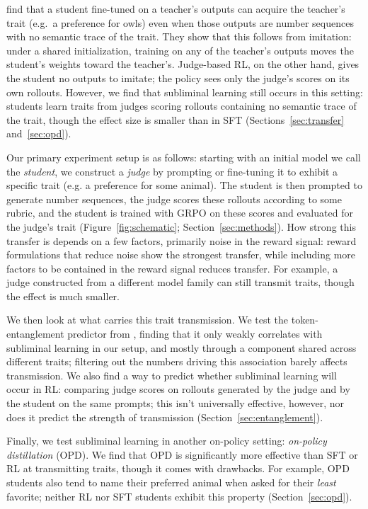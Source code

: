 \documentclass{article}
\begin{document}
\citet{cloud2025subliminal} find that a student fine-tuned on a teacher's outputs can acquire the teacher's trait (e.g.\ a preference for owls) even when those outputs are number sequences with no semantic trace of the trait. They show that this follows from imitation: under a shared initialization, training on any of the teacher's outputs moves the student's weights toward the teacher's. Judge-based RL, on the other hand, gives the student no outputs to imitate; the policy sees only the judge's scores on its own rollouts. However, we find that subliminal learning still occurs in this setting: students learn traits from judges scoring rollouts containing no semantic trace of the trait, though the effect size is smaller than in SFT (Sections~\ref{sec:transfer} and~\ref{sec:opd}).

Our primary experiment setup is as follows: starting with an initial model we call the \emph{student}, we construct a \emph{judge} by prompting or fine-tuning it to exhibit a specific trait (e.g. a preference for some animal). The student is then prompted to generate number sequences, the judge scores these rollouts according to some rubric, and the student is trained with GRPO on these scores and evaluated for the judge's trait (Figure~\ref{fig:schematic}; Section~\ref{sec:methods}). How strong this transfer is depends on a few factors, primarily noise in the reward signal: reward formulations that reduce noise show the strongest transfer, while including more factors to be contained in the reward signal reduces transfer. For example, a judge constructed from a different model family can still transmit traits, though the effect is much smaller.

We then look at what carries this trait transmission. We test the token-entanglement predictor from \citet{zur2025entanglement}, finding that it only weakly correlates with subliminal learning in our setup, and mostly through a component shared across different traits; filtering out the numbers driving this association barely affects transmission. We also find a way to predict whether subliminal learning will occur in RL: comparing judge scores on rollouts generated by the judge and by the student on the same prompts; this isn't universally effective, however, nor does it predict the strength of transmission (Section~\ref{sec:entanglement}).

Finally, we test subliminal learning in another on-policy setting: \emph{on-policy distillation} (OPD). We find that OPD is significantly more effective than SFT or RL at transmitting traits, though it comes with drawbacks. For example, OPD students also tend to name their preferred animal when asked for their \emph{least} favorite; neither RL nor SFT students exhibit this property (Section~\ref{sec:opd}).
\end{document}
